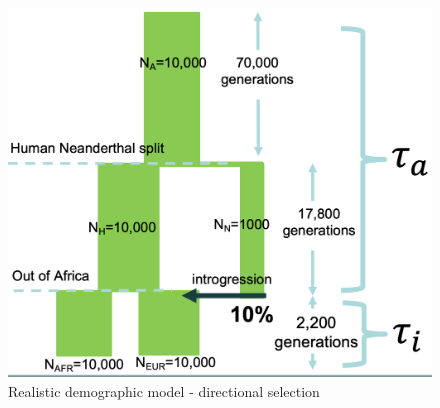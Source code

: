 \begin{figure}[htb]
    \centering
    \includegraphics[width=\textwidth]{chapter5/figures/fig5.5.png}
    \caption{Realistic demographic model - directional selection}
    \label{fig:5.5}
\end{figure}